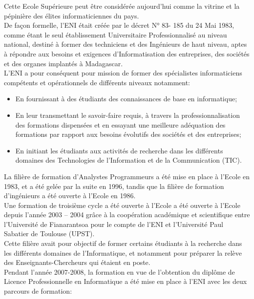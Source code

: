 \documentclass[12pt]{report}
\begin{document}
				Cette Ecole Supérieure peut être considérée aujourd’hui comme la vitrine et la pépinière des élites informaticiennes du pays.\\
	
				De façon formelle, l’ENI était créée par le décret N° 83- 185 du 24 Mai 1983, comme étant le seul établissement Universitaire Professionnalisé au niveau national, destiné à former des techniciens et des Ingénieurs de haut niveau, aptes à répondre aux besoins et exigences d’Informatisation des entreprises, des sociétés et des organes implantés à Madagascar.\\

				L’ENI a pour conséquent pour mission de former des spécialistes informaticiens compétents et opérationnels de différents niveaux notamment: 
				
								\begin{itemize}
									\item En fournissant à des étudiants des connaissances de base en informatique;
									\item En leur transmettant le savoir-faire requis, à travers la professionnalisation des formations dispensées et en essayant une meilleure adéquation des formations par rapport aux besoins évolutifs des sociétés et des entreprises;
									\item En initiant les étudiants aux activités de recherche dans les différents domaines des Technologies de l’Information et de la Communication (TIC).
								\end{itemize}

				La filière de formation d’Analystes Programmeurs a été mise en place à l’Ecole en 1983, et a été gelée par la suite en 1996, tandis que la filière de formation d’ingénieurs a été ouverte à l’Ecole en 1986.\\
				
				Une formation de troisième cycle a été ouverte à l’Ecole a été ouverte à l’Ecole depuis l’année 2003 – 2004 grâce à la coopération académique et scientifique entre l’Université de Fianarantsoa pour le compte de l’ENI et l’Université Paul Sabatier de Toulouse (UPST).\\

				Cette filière avait pour objectif de former certains étudiants à la recherche dans les différents domaines de l’Informatique, et notamment pour préparer la relève des Enseignants-Chercheurs qui étaient en poste.\\

				Pendant l’année 2007-2008, la formation en vue de l’obtention du diplôme de Licence Professionnelle en Informatique a été mise en place à l’ENI avec les deux parcours de formation:
					
\end{document}
